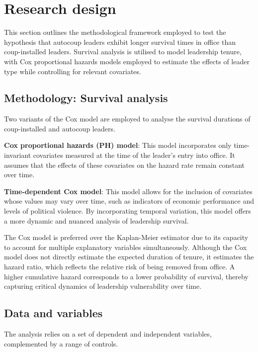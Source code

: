 \documentclass[
  12pt,
]{report}
\begin{document}
\section{Research design}\label{research-design-1}

This section outlines the methodological framework employed to test the
hypothesis that autocoup leaders exhibit longer survival times in office
than coup-installed leaders. Survival analysis is utilised to model
leadership tenure, with Cox proportional hazards models employed to
estimate the effects of leader type while controlling for relevant
covariates.

\subsection{Methodology: Survival
analysis}\label{methodology-survival-analysis}

Two variants of the Cox model are employed to analyse the survival
durations of coup-installed and autocoup leaders.

\textbf{Cox proportional hazards (PH) model}: This model incorporates
only time-invariant covariates measured at the time of the leader's
entry into office. It assumes that the effects of these covariates on
the hazard rate remain constant over time.

\textbf{Time-dependent Cox model}: This model allows for the inclusion
of covariates whose values may vary over time, such as indicators of
economic performance and levels of political violence. By incorporating
temporal variation, this model offers a more dynamic and nuanced
analysis of leadership survival.

The Cox model is preferred over the Kaplan-Meier estimator due to its
capacity to account for multiple explanatory variables simultaneously.
Although the Cox model does not directly estimate the expected duration
of tenure, it estimates the hazard ratio, which reflects the relative
risk of being removed from office. A higher cumulative hazard
corresponds to a lower probability of survival, thereby capturing
critical dynamics of leadership vulnerability over time.

\subsection{Data and variables}\label{data-and-variables-1}

The analysis relies on a set of dependent and independent variables,
complemented by a range of controls.
\end{document}
